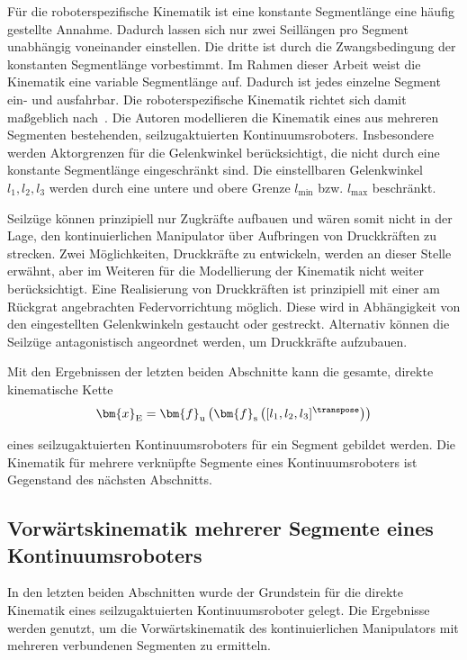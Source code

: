 Für die roboterspezifische Kinematik ist eine konstante Segmentlänge eine häufig gestellte Annahme. Dadurch lassen sich nur zwei Seillängen pro Segment unabhängig voneinander einstellen. Die dritte ist durch die Zwangsbedingung der konstanten Segmentlänge vorbestimmt. 
Im Rahmen dieser Arbeit weist die Kinematik eine variable Segmentlänge auf. Dadurch ist jedes einzelne Segment ein- und ausfahrbar. Die roboterspezifische Kinematik richtet sich damit maßgeblich nach~\cite{JW06a}. Die Autoren modellieren die Kinematik eines aus mehreren Segmenten bestehenden, seilzugaktuierten Kontinuumsroboters. Insbesondere werden Aktorgrenzen für die Gelenkwinkel berücksichtigt, die nicht durch eine konstante Segmentlänge eingeschränkt sind. Die einstellbaren \mbox{Gelenkwinkel $l_1, l_2, l_3$} werden durch eine untere und obere Grenze $l_{\mathrm{min}}$ bzw. $l_{\mathrm{max}}$ beschränkt. 

Seilzüge können prinzipiell nur Zugkräfte aufbauen und wären somit nicht in der Lage, den kontinuierlichen Manipulator über Aufbringen von Druckkräften zu strecken. Zwei Möglichkeiten, Druckkräfte zu entwickeln, werden an dieser Stelle erwähnt, aber im Weiteren für die Modellierung der Kinematik nicht weiter berücksichtigt. Eine Realisierung von Druckkräften ist prinzipiell mit einer am Rückgrat angebrachten Federvorrichtung möglich. Diese wird in Abhängigkeit von den eingestellten Gelenkwinkeln gestaucht oder gestreckt. Alternativ können die Seilzüge antagonistisch angeordnet werden, um Druckkräfte aufzubauen.  \newline

Mit den Ergebnissen der letzten beiden Abschnitte kann die gesamte, direkte kinematische Kette  
\begin{align}
\bm{x}_\mathrm{E} = \bm{f}_\mathrm{u} \left( \bm{f}_\mathrm{s} \left( [l_1, l_2, l_3]^\transpose \right) \right)
\label{eq:kinematische_kette}
\end{align}

eines seilzugaktuierten Kontinuumsroboters für ein Segment gebildet werden. Die Kinematik für mehrere verknüpfte Segmente eines Kontinuumsroboters ist Gegenstand des nächsten Abschnitts.

\subsection{Vorwärtskinematik mehrerer Segmente eines Kontinuumsroboters}
\label{subsec:multikinematik}

In den letzten beiden Abschnitten wurde der Grundstein für die direkte Kinematik eines seilzugaktuierten Kontinuumsroboter gelegt. Die Ergebnisse werden genutzt, um die Vorwärtskinematik des kontinuierlichen Manipulators mit mehreren verbundenen Segmenten zu ermitteln. \newline

